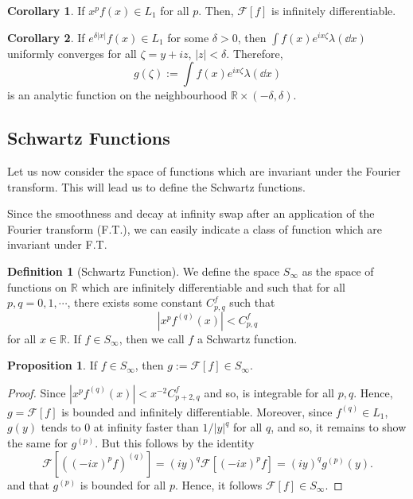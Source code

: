 \documentclass[]{article}
\theoremstyle{definition}
\newtheorem{corollary}{Corollary}[theorem]
\theoremstyle{definition}
\newtheorem{definition}{Definition}[section]
\newtheorem{proposition}{Proposition}[section]
\begin{document}
\begin{corollary}
  If \(x^pf(x) \in L_1\) for all \(p\). Then, \(\mathcal{F}[f]\) is infinitely 
  differentiable. 
\end{corollary}

\begin{corollary}
  If \(e^{\delta |x|}f(x) \in L_1\) for some \(\delta > 0\), then 
  \(\int f(x)e^{ix \zeta} \lambda(\dd x)\) uniformly converges for all 
  \(\zeta = y + iz\), \(|z| < \delta\). Therefore, 
  \[g(\zeta) := \int f(x) e^{ix\zeta} \lambda(\dd x)\]
  is an analytic function on the neighbourhood \(\mathbb{R} \times (-\delta, \delta)\).
\end{corollary}

\subsection{Schwartz Functions}

Let us now consider the space of functions which are invariant under the Fourier 
transform. This will lead us to define the Schwartz functions.

Since the smoothness and decay at infinity swap after an application of the Fourier 
transform (F.T.), we can easily indicate a class of function which are invariant 
under F.T.

\begin{definition}[Schwartz Function]
  We define the space \(S_\infty\) as the space of functions on \(\mathbb{R}\) 
  which are infinitely differentiable and such that for all \(p, q = 0, 1, \cdots\), 
  there exists some constant \(C_{p, q}^f\) such that 
  \[|x^p f^{(q)}(x)| < C_{p, q}^f\]
  for all \(x \in \mathbb{R}\). If \(f \in S_\infty\), then we call \(f\) a Schwartz 
  function.
\end{definition}

\begin{proposition}
   If \(f \in S_\infty\), then \(g := \mathcal{F}[f] \in S_\infty\).
\end{proposition}
\begin{proof}
  Since \(|x^pf^{(q)}(x)| < x^{-2} C_{p + 2, q}^f\) and so, is integrable 
  for all \(p, q\). Hence, \(g = \mathcal{F}[f]\) is bounded and infinitely differentiable.
  Moreover, since \(f^{(q)} \in L_1\), \(g(y)\) tends to 0 at infinity faster 
  than \(1 / |y|^q\) for all \(q\), and so, it remains to show the same for \(g^{(p)}\). 
  But this follows by the identity 
  \[\mathcal{F}[((-ix)^p f)^{(q)}] = (i y)^q \mathcal{F}[(-ix)^p f] = 
    (iy)^q g^{(p)}(y).\]
  and that \(g^{(p)}\) is bounded for all \(p\). Hence, it follows \(\mathcal{F}[f] \in S_\infty\).
\end{proof}
\end{document}
